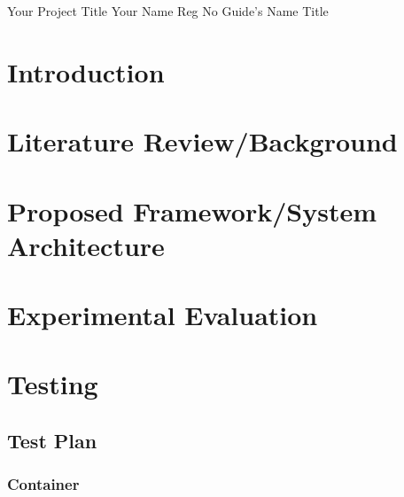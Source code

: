 \documentclass{vitmsprojectreport}
\begin{document}
\maketitlepage%
{Your Project Title}%
{Your Name}%
{Reg No}%
{Guide's Name}%
{Title}%

\makedeclarationpage%

\makebonafidepage%

\makeackpage%

\makeexecsummarypage

\tableofcontents  %
\clearpage
\listoffigures    %
\clearpage
\listoftables     %
\clearpage

\chapter{Introduction}

\chapter{Literature Review/Background}

\chapter{Proposed Framework/System Architecture}

\chapter{Experimental Evaluation}

\chapter{Testing}

\section{Test Plan}

\subsection{Container}
\end{document}
